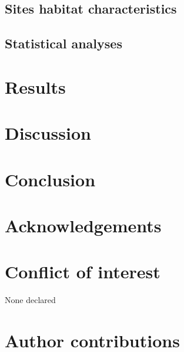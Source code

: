  

\subsection*{Sites habitat characteristics}
\label{subsec:habitat}

\subsection*{Statistical analyses}
\label{subsec:analyses}

\clearpage

\section*{Results}
\label{sec:results1}

\clearpage

\section*{Discussion}
\label{sec:discu1}

\section*{Conclusion}
\label{sec:conclu1}

\section*{Acknowledgements}
\label{sec:acknowl1}

\section*{Conflict of interest}
\label{sec:conflict1}

None declared

\section*{Author contributions}
\label{sec:author1}

\cleardoublepage


\begin{otherlanguage}{english}


\end{otherlanguage}
